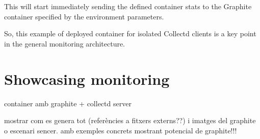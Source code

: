 This will start immediately sending the defined container stats to the Graphite container specified by the environment parameters.

So, this example of deployed container for isolated Collectd clients is a key point in the general monitoring architecture.

\section{Showcasing monitoring}

container amb graphite + collectd server

mostrar com es genera tot (referències a fitxers externs??) i imatges del graphite o escenari sencer. amb exemples concrets mostrant potencial de graphite!!!